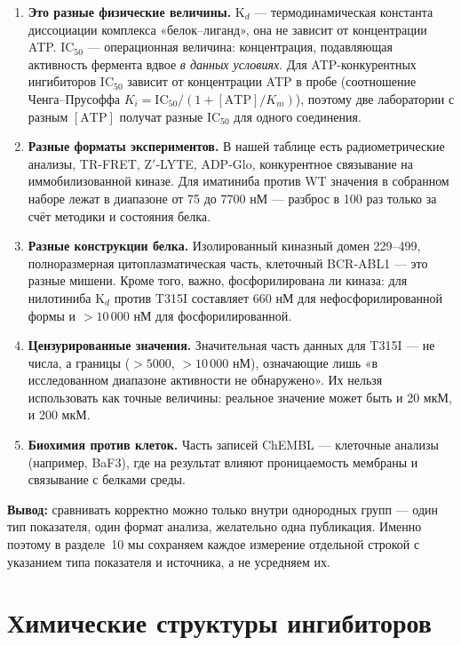 \documentclass[12pt,a4paper]{article}
\begin{document}
\begin{enumerate}[leftmargin=*,topsep=2pt,itemsep=3pt]
\item \textbf{Это разные физические величины.} K$_d$ --- термодинамическая константа
диссоциации комплекса «белок--лиганд», она не зависит от концентрации ATP. IC$_{50}$ ---
операционная величина: концентрация, подавляющая активность фермента вдвое \emph{в
данных условиях}. Для ATP-конкурентных ингибиторов IC$_{50}$ зависит от концентрации ATP
в пробе (соотношение Ченга--Прусоффа $K_i = \mathrm{IC}_{50}/(1 + [\mathrm{ATP}]/K_m)$),
поэтому две лаборатории с разным $[\mathrm{ATP}]$ получат разные IC$_{50}$ для одного
соединения.
\item \textbf{Разные форматы экспериментов.} В нашей таблице есть радиометрические
анализы, TR-FRET, Z$'$-LYTE, ADP-Glo, конкурентное связывание на иммобилизованной киназе.
Для иматиниба против WT значения в собранном наборе лежат в диапазоне от 75 до 7700 нМ ---
разброс в 100 раз только за счёт методики и состояния белка.
\item \textbf{Разные конструкции белка.} Изолированный киназный домен 229--499,
полноразмерная цитоплазматическая часть, клеточный BCR-ABL1 --- это разные мишени.
Кроме того, важно, фосфорилирована ли киназа: для нилотиниба K$_d$ против T315I
составляет 660 нМ для нефосфорилированной формы и $>10\,000$ нМ для фосфорилированной.
\item \textbf{Цензурированные значения.} Значительная часть данных для T315I ---
не числа, а границы ($>5000$, $>10\,000$ нМ), означающие лишь «в исследованном диапазоне
активности не обнаружено». Их нельзя использовать как точные величины: реальное значение
может быть и 20 мкМ, и 200 мкМ.
\item \textbf{Биохимия против клеток.} Часть записей ChEMBL --- клеточные анализы
(например, BaF3), где на результат влияют проницаемость мембраны и связывание с белками
среды.
\end{enumerate}

\noindent\textbf{Вывод:} сравнивать корректно можно только внутри однородных групп ---
один тип показателя, один формат анализа, желательно одна публикация. Именно поэтому в
разделе~10 мы сохраняем каждое измерение отдельной строкой с указанием типа показателя и
источника, а не усредняем их.

\section{Химические структуры ингибиторов}
\end{document}
